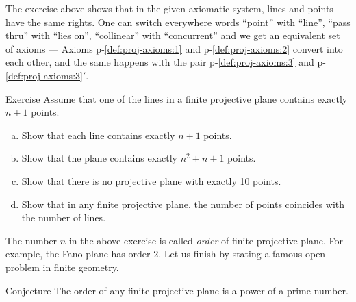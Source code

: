 The exercise above shows that in the given axiomatic system,
lines and points have the same rights.
One can switch everywhere words ``point'' with ``line'', ``pass thru'' with ``lies on'', ``collinear'' with ``concurrent'' and we get an equivalent set of axioms ---  Axioms p-\ref{def:proj-axioms:1} and p-\ref{def:proj-axioms:2} convert into each other,
and the same happens with the pair p-\ref{def:proj-axioms:3} and p-\ref{def:proj-axioms:3}$'$.

\begin{thm}{Exercise}\label{ex:oder}
Assume that one of the lines in a finite projective plane contains exactly $n+1$ points.
\begin{enumerate}[(a)]
\item\label{ex:oder:a} Show that each line contains exactly $n+1$ points.
\item\label{ex:oder:b} Show that the plane contains  exactly $n^2+n+1$ points.
\item\label{ex:oder:c} Show that there is no projective plane with exactly 10 points.
\item\label{ex:oder:d} Show that in any finite projective plane, the number of points coincides with the number of lines.
\end{enumerate}
\end{thm}

The number $n$ in the above exercise is called \emph{order} of finite projective plane.
For example, the Fano plane has order $2$.
Let us finish by stating a famous open problem in finite geometry.

\begin{thm}{Conjecture}
The order of any finite projective plane is a power of a prime number.
\end{thm}
